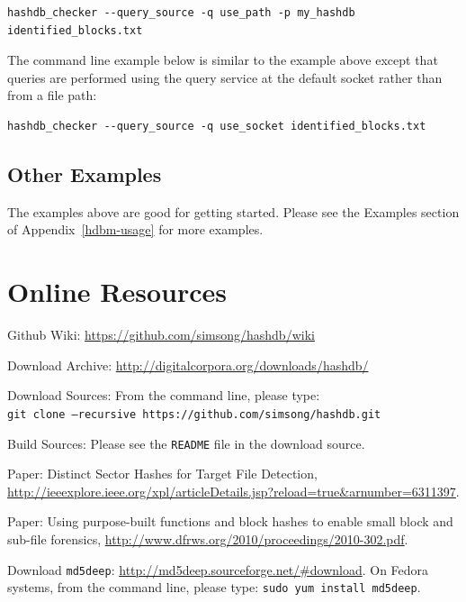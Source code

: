 \documentclass[11pt,twoside]{article}
\begin{document}
\begin{small}
\begin{verbatim}
hashdb_checker --query_source -q use_path -p my_hashdb identified_blocks.txt
\end{verbatim}
\end{small}

The command line example below is similar to the example above
except that queries are performed
using the query service at the default socket rather than from a file path:

\begin{small}
\begin{verbatim}
hashdb_checker --query_source -q use_socket identified_blocks.txt
\end{verbatim}
\end{small}

\subsection{Other Examples}
The examples above are good for getting started.
Please see the Examples section of Appendix~\ref{hdbm-usage}
for more examples.

\section{Online Resources}
\begin{compactitem}	
\item Github Wiki: \url{https://github.com/simsong/hashdb/wiki}
\item Download Archive: \url{http://digitalcorpora.org/downloads/hashdb/}
\item Download Sources: From the command line, please type: \\
\texttt{git clone --recursive https://github.com/simsong/hashdb.git}
\item Build Sources: Please see the \texttt{README} file in the download source.
\item Paper: Distinct Sector Hashes for Target File Detection,
\url{http://ieeexplore.ieee.org/xpl/articleDetails.jsp?reload=true&arnumber=6311397}.
\item Paper: Using purpose-built functions and block hashes to enable small block and sub-file forensics,
\url{http://www.dfrws.org/2010/proceedings/2010-302.pdf}.
\item Download \texttt{md5deep}: \url{http://md5deep.sourceforge.net/#download}.
On Fedora systems, from the command line, please type: \texttt{sudo yum install md5deep}.
\end{compactitem}	
\end{document}
